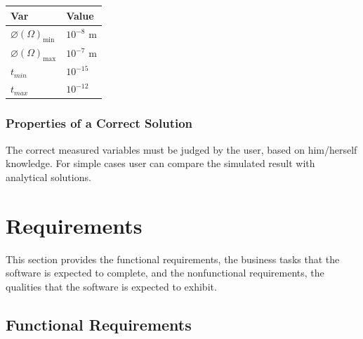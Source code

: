 \documentclass[12pt]{article}
\begin{document}
\begin{table}[!h]
\caption{Specification Parameter Values} \label{TblSpecParams}
\renewcommand{\arraystretch}{1.2}
\noindent \begin{longtable*}{l l} 
  \toprule
  \textbf{Var} & \textbf{Value} \\
  \midrule 
  $\varnothing(\Omega)_{\text{min}}$ & $10^{-8}$ \si{\metre}\\
  $\varnothing(\Omega)_{\text{max}}$ & $10^{-7}$ \si{\metre}\\
  $t_{min}$ & $10^{-15}$\\
  $t_{max}$ & $10^{-12}$\\
  
  
  \bottomrule
\end{longtable*}
\end{table}

\subsubsection{Properties of a Correct Solution} \label{sec_CorrectSolution}

The correct measured variables must be judged by the user, based on him/herself knowledge. For simple cases user can compare the simulated result with analytical solutions.



\section{Requirements}


This section provides the functional requirements, the business tasks that the
software is expected to complete, and the nonfunctional requirements, the
qualities that the software is expected to exhibit.

\subsection{Functional Requirements}
\end{document}
